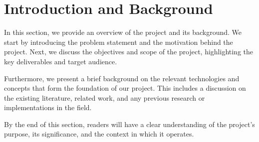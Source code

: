 
\section{Introduction and Background}

In this section, we provide an overview of the project and its background. We start by introducing the problem statement and the motivation behind the project. Next, we discuss the objectives and scope of the project, highlighting the key deliverables and target audience.

Furthermore, we present a brief background on the relevant technologies and concepts that form the foundation of our project. This includes a discussion on the existing literature, related work, and any previous research or implementations in the field.

By the end of this section, readers will have a clear understanding of the project's purpose, its significance, and the context in which it operates.

